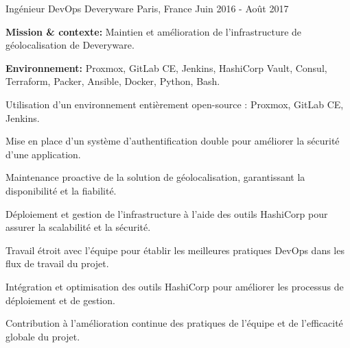 \begin{cventries}
\cventry
{Ingénieur DevOps} %
{Deveryware} %
{Paris, France} %
{Juin 2016 - Août 2017} %
{
  \begin{cvitems} %
    \item {\textbf{Mission \& contexte:} Maintien et amélioration de l'infrastructure de géolocalisation de Deveryware.}
    \item {\textbf{Environnement:} Proxmox, GitLab CE, Jenkins, HashiCorp Vault, Consul, Terraform, Packer, Ansible, Docker, Python, Bash.}
    \item {Utilisation d'un environnement entièrement open-source : Proxmox, GitLab CE, Jenkins.}
    \item {Mise en place d'un système d'authentification double pour améliorer la sécurité d'une application.}
    \item {Maintenance proactive de la solution de géolocalisation, garantissant la disponibilité et la fiabilité.}
    \item {Déploiement et gestion de l'infrastructure à l'aide des outils HashiCorp pour assurer la scalabilité et la sécurité.}
    \item {Travail étroit avec l'équipe pour établir les meilleures pratiques DevOps dans les flux de travail du projet.}
    \item {Intégration et optimisation des outils HashiCorp pour améliorer les processus de déploiement et de gestion.}
    \item {Contribution à l'amélioration continue des pratiques de l'équipe et de l'efficacité globale du projet.}
  \end{cvitems}
}


\end{cventries}
